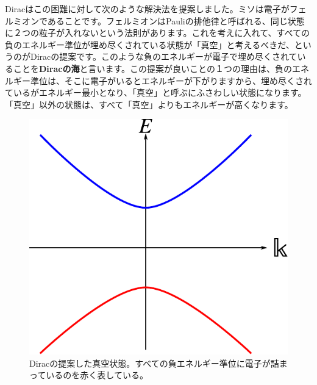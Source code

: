 \documentclass[report,paper=a4, fontsize=12pt, line_length=16cm, number_of_lines=33,dvipdfmx]{jlreq}
\numberwithin{equation}{chapter}
\newcommand{\strong}[1]{{\sffamily \bfseries #1}}
\begin{document}
Diracはこの困難に対して次のような解決法を提案しました。ミソは電子がフェルミオンであることです。フェルミオンはPauliの排他律と呼ばれる、同じ状態に２つの粒子が入れないという法則があります。これを考えに入れて、すべての負のエネルギー準位が埋め尽くされている状態が「真空」と考えるべきだ、というのがDiracの提案です。このような負のエネルギーが電子で埋め尽くされていることを\strong{Diracの海}と言います。この提案が良いことの１つの理由は、負のエネルギー準位は、そこに電子がいるとエネルギーが下がりますから、埋め尽くされているがエネルギー最小となり、「真空」と呼ぶにふさわしい状態になります。「真空」以外の状態は、すべて「真空」よりもエネルギーが高くなります。
\begin{figure}[htbp]
  \centering
  \includegraphics{diracsea.pdf}
  \caption{Diracの提案した真空状態。すべての負エネルギー準位に電子が詰まっているのを赤く表している。}
  \label{fig:diracsea}
\end{figure}
\end{document}
